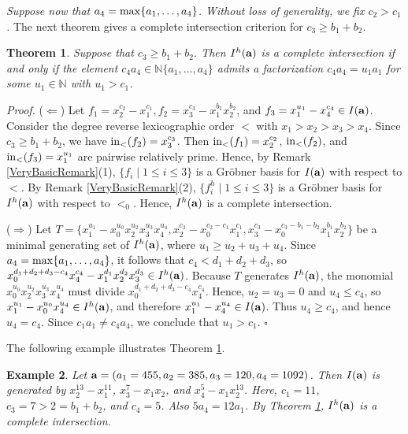 \documentclass[10pt]{amsart}
\newtheorem{thm1}{Theorem}[section]
\newtheorem{ex1}[thm1]{Example}
\begin{document}
{\em Suppose now that $a_{4}={\rm max}\{a_1,\ldots,a_4\}$. Without loss of generality, we fix $c_{2}>c_{1}$.} The next theorem gives a complete intersection criterion for $c_{3} \geq b_1+b_2$.

\begin{thm1} \label{Basic25} Suppose that $c_{3} \geq b_1+b_2$. Then $I^{h}({\bf a})$ is a complete intersection if and only if the element $c_{4}a_4 \in \mathbb{N}\{a_1,\ldots,a_4\}$ admits a factorization $c_{4}a_4=u_1a_{1}$ for some $u_1 \in \mathbb{N}$ with $u_{1}>c_1$.
\end{thm1}

{\em \noindent Proof.} ($\Leftarrow$) Let $f_{1}=x_{2}^{c_2}-x_{1}^{c_1}, f_{2}=x_{3}^{c_3}-x_{1}^{b_1}x_2^{b_2}$, and $f_{3}=x_{1}^{u_1}-x_{4}^{c_4} \in I({\bf a})$. Consider the degree reverse lexicographic order $<$ with $x_1>x_2>x_3>x_4$. Since $c_3 \geq b_1+b_2$, we have ${\rm in}_{<}(f_2)=x_{3}^{c_3}$. Then ${\rm in}_{<}(f_{1})=x_{2}^{c_2}$, ${\rm in}_{<}(f_{2})$, and ${\rm in}_{<}(f_{3})=x_{1}^{u_1}$ are pairwise relatively prime. Hence, by Remark \ref{VeryBasicRemark}(1), $\{f_{i} \mid 1 \leq i \leq 3\}$ is a Gr\"obner basis for $I({\bf a})$ with respect to $<$. By Remark \ref{VeryBasicRemark}(2), $\{f_{i}^h \mid 1 \leq i \leq 3\}$ is a Gr\"obner basis for $I^{h}({\bf a})$ with respect to $<_{0}$. Hence, $I^{h}({\bf a})$ is a complete intersection.

($\Rightarrow$) Let $T=\{x_{1}^{u_1}-x_{0}^{u_0}x_{2}^{u_2}x_{3}^{u_3}x_{4}^{u_4}, x_{2}^{c_2}-x_{0}^{c_2-c_1}x_{1}^{c_1}, x_{3}^{c_3}-x_{0}^{c_3-b_1-b_2}x_{1}^{b_1}x_{2}^{b_2}\}$ be a minimal generating set of $I^{h}({\bf a})$, where $u_{1} \geq u_2+u_3+u_4$. Since $a_{4}={\rm max}\{a_1,\ldots,a_4\}$, it follows that $c_{4}<d_{1}+d_{2}+d_3$, so $x_{0}^{d_{1}+d_{2}+d_3-c_{4}}x_{4}^{c_4}-x_{1}^{d_1}x_{2}^{d_2}x_{3}^{d_3} \in I^{h}({\bf a})$. Because $T$ generates $I^{h}({\bf a})$, the monomial $x_{0}^{u_0}x_{2}^{u_2}x_{3}^{u_3}x_{4}^{u_4}$ must divide $x_{0}^{d_{1}+d_{2}+d_3-c_{4}}x_{4}^{c_4}$. Hence, $u_{2}=u_{3}=0$ and $u_{4} \leq c_4$, so $x_{1}^{u_1}-x_{0}^{u_0}x_{4}^{u_4} \in I^{h}({\bf a})$, and therefore $x_{1}^{u_1}-x_{4}^{u_4} \in I({\bf a})$. Thus $u_{4} \geq c_{4}$, and hence $u_{4}=c_{4}$. Since $c_{1}a_1 \neq c_{4}a_4$, we conclude that $u_1>c_1$. \hfill $\square$ \par\vspace{0.5\baselineskip}

The following example illustrates Theorem \ref{Basic25}.

\begin{ex1} {\rm Let ${\bf a}=(a_{1}=455,a_2=385,a_3=120,a_{4}=1092)$. Then $I({\bf a})$ is generated by $x_{2}^{13}-x_{1}^{11}$, $x_{3}^{7}-x_{1}x_{2}$, and $x_{4}^{5}-x_{1}x_2^{13}$. Here, $c_1=11$, $c_{3}=7> 2=b_1+b_2$, and $c_{4}=5$. Also $5a_4=12a_1$. By Theorem \ref{Basic25}, $I^{h}({\bf a})$ is a complete intersection.}
\end{ex1}
\end{document}
